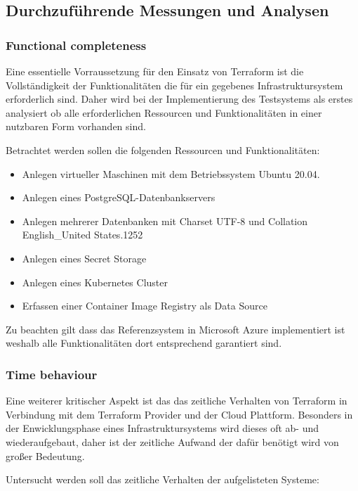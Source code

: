 \begin{spacing}{1.2}
\subsection{Durchzuführende Messungen und Analysen}

\subsubsection{Functional completeness}

Eine essentielle Vorraussetzung für den Einsatz von Terraform ist die
Vollständigkeit der Funktionalitäten die für ein gegebenes
Infrastruktursystem erforderlich sind. Daher wird bei der
Implementierung des Testsystems als erstes analysiert ob alle
erforderlichen Ressourcen und Funktionalitäten in einer nutzbaren
Form vorhanden sind.

Betrachtet werden sollen die folgenden Ressourcen und
Funktionalitäten:

\begin{itemize}
  \item Anlegen virtueller Maschinen mit dem Betriebssystem Ubuntu 20.04.
  \item Anlegen eines PostgreSQL-Datenbankservers
  \item Anlegen mehrerer Datenbanken mit Charset UTF-8
  und Collation English\_United States.1252
  \item Anlegen eines Secret Storage
  \item Anlegen eines Kubernetes Cluster
  \item Erfassen einer Container Image Registry als Data Source
\end{itemize}

Zu beachten gilt dass das Referenzsystem in Microsoft Azure
implementiert ist weshalb alle Funktionalitäten dort entsprechend
garantiert sind.

\subsubsection{Time behaviour}

Eine weiterer kritischer Aspekt ist das das zeitliche Verhalten
von Terraform in Verbindung mit dem Terraform Provider und der
Cloud Plattform. Besonders in der Enwicklungsphase eines
Infrastruktursystems wird dieses oft ab- und wiederaufgebaut,
daher ist der zeitliche Aufwand der dafür benötigt wird von großer
Bedeutung.

Untersucht werden soll das zeitliche Verhalten der aufgelisteten
Systeme:


\end{spacing}
